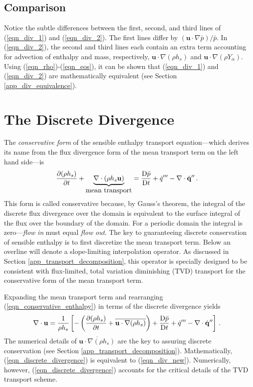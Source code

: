 \subsection{Comparison}
Notice the subtle differences between the first, second, and third lines of (\ref{eqn_div_1}) and (\ref{eqn_div_2}).  The first lines differ by $\displaystyle (\mathbf{u}\cdot\nabla \bar{p})/\bar{p}$. In (\ref{eqn_div_2}), the second and third lines each contain an extra term accounting for advection of enthalpy and mass, respectively, $\mathbf{u} \cdot\nabla (\rho h_s)$ and $\mathbf{u} \cdot \nabla (\rho Y_\alpha)$.  Using (\ref{eqn_rho})-(\ref{eqn_eos}), it can be shown that (\ref{eqn_div_1}) and (\ref{eqn_div_2}) are mathematically equivalent (see Section \ref{app_div_equivalence}).


\section{The Discrete Divergence}
\label{discrete_divergence}

The \emph{conservative form} of the sensible enthalpy transport equation---which derives its name from the flux divergence form of the mean transport term on the left hand side---is
\begin{equation}
\label{eqn_conservative_enthalpy}
\frac{\partial (\rho h_s)}{\partial t} + \underbrace{\nabla\cdot(\rho h_s \mathbf{u})}_{\mbox{mean transport}} = \frac{\mbox{D} \bar{p}}{\mbox{D} t} + \dot{q}^{\prime\prime\prime} - \nabla\cdot \dot{\mathbf{q}}^{\prime\prime} \,\mbox{.}
\end{equation}
This form is called conservative because, by Gauss's theorem, the integral of the discrete flux divergence over the domain is equivalent to the surface integral of the flux over the boundary of the domain.  For a periodic domain the integral is zero---\emph{flow in} must equal \emph{flow out}. The key to guaranteeing discrete conservation of sensible enthalpy is to first discretize the mean transport term.  Below an overline will denote a slope-limiting interpolation operator.  As discussed in Section \ref{app_transport_decomposition}, this operator is specially designed to be consistent with flux-limited, total variation diminishing (TVD) transport for the conservative form of the mean transport term.

Expanding the mean transport term and rearranging (\ref{eqn_conservative_enthalpy}) in terms of the discrete divergence yields
\begin{equation}
\label{eqn_discrete_divergence}
\nabla\cdot \mathbf{u} = \frac{1}{\rho h_s}\left[ -\left( \frac{\partial (\rho h_s)}{\partial t} + \overline{\mathbf{u}\cdot\nabla(\rho h_s)} \right) + \frac{\mbox{D} \bar{p}}{\mbox{D} t} + \dot{q}^{\prime\prime\prime} - \nabla\cdot \dot{\mathbf{q}}^{\prime\prime} \right] \,\mbox{.}
\end{equation}
The numerical details of $\overline{\mathbf{u}\cdot\nabla(\rho h_s)}$ are the key to assuring discrete conservation (see Section \ref{app_transport_decomposition}). Mathematically, (\ref{eqn_discrete_divergence}) is  equivalent to (\ref{eqn_div_new}). Numerically, however, (\ref{eqn_discrete_divergence}) accounts for the critical details of the TVD transport scheme.

